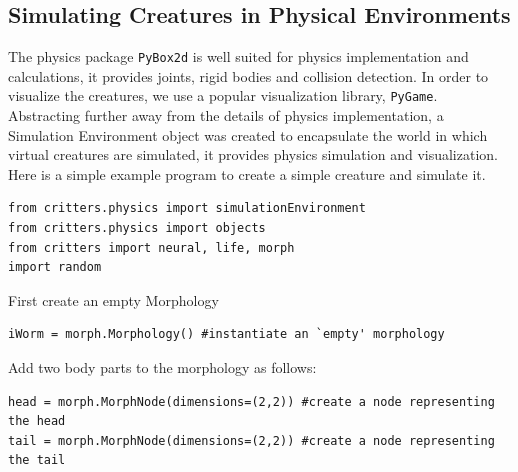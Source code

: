 \documentclass[12pt]{article}
\begin{document}
\subsection{Simulating Creatures in Physical Environments}
The physics package \verb|PyBox2d| is well suited for physics implementation and calculations, it provides joints, rigid bodies and collision detection. In order to visualize the creatures, we use a popular visualization library, \verb|PyGame|. Abstracting further away from the details of physics implementation, a Simulation Environment object was created to encapsulate the world in which virtual creatures are simulated, it provides physics simulation and visualization.
Here is a simple example program to create a simple creature and simulate it.
\begin{verbatim}
from critters.physics import simulationEnvironment
from critters.physics import objects
from critters import neural, life, morph
import random
\end{verbatim}

First create an empty Morphology
\begin{verbatim}
iWorm = morph.Morphology() #instantiate an `empty' morphology
\end{verbatim}

Add two body parts to the morphology  as follows:
\begin{verbatim}
head = morph.MorphNode(dimensions=(2,2)) #create a node representing the head
tail = morph.MorphNode(dimensions=(2,2)) #create a node representing the tail
\end{verbatim}
\end{document}
